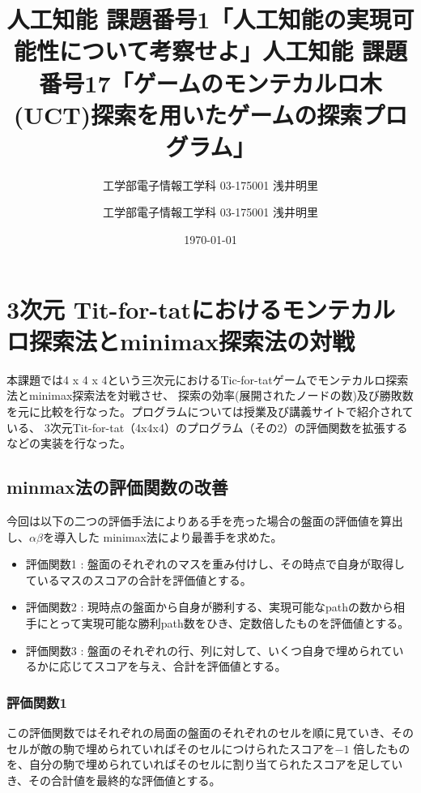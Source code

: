 \documentclass[uplatex]{jsarticle}
\title{人工知能 課題番号1「人工知能の実現可能性について考察せよ」}
\author{工学部電子情報工学科 03-175001 浅井明里}
\title{人工知能 課題番号17「ゲームのモンテカルロ木(UCT)探索を用いたゲームの探索プログラム」}
\author{工学部電子情報工学科 03-175001 浅井明里}
\date{\today}
\makeatletter
\def\maketitle{%
  \null
  \thispagestyle{empty}%
  \vfill
  \begin{center}\leavevmode
    \normalfont
    {\LARGE \@title\par}%
    \vskip 1cm
    {\Large \@author\par}%
    \vskip 1cm
    {\Large \@date\par}%
  \end{center}%
  \vfill
  \null
  \@thanks%
  \cleardoublepage
  }
\makeatother
\begin{document}
\maketitle


\section{3次元 Tit-for-tatにおけるモンテカルロ探索法とminimax探索法の対戦}
本課題では4 x 4 x 4という三次元におけるTic-for-tatゲームでモンテカルロ探索法とminimax探索法を対戦させ、
探索の効率(展開されたノードの数)及び勝敗数を元に比較を行なった。プログラムについては授業及び講義サイトで紹介されている、
3次元Tit-for-tat（4x4x4）のプログラム（その2）の評価関数を拡張するなどの実装を行なった。

\subsection{minmax法の評価関数の改善}
今回は以下の二つの評価手法によりある手を売った場合の盤面の評価値を算出し、$\alpha\beta$を導入した
minimax法により最善手を求めた。
\begin{itemize}
  \item 評価関数1 : 盤面のそれぞれのマスを重み付けし、その時点で自身が取得しているマスのスコアの合計を評価値とする。
  \item 評価関数2 : 現時点の盤面から自身が勝利する、実現可能なpathの数から相手にとって実現可能な勝利path数をひき、定数倍したものを評価値とする。
  \item 評価関数3 : 盤面のそれぞれの行、列に対して、いくつ自身で埋められているかに応じてスコアを与え、合計を評価値とする。
\end{itemize}

\subsubsection{評価関数1}
この評価関数ではそれぞれの局面の盤面のそれぞれのセルを順に見ていき、そのセルが敵の駒で埋められていればそのセルにつけられたスコアを$-1$
倍したものを、自分の駒で埋められていればそのセルに割り当てられたスコアを足していき、その合計値を最終的な評価値とする。
\end{document}
